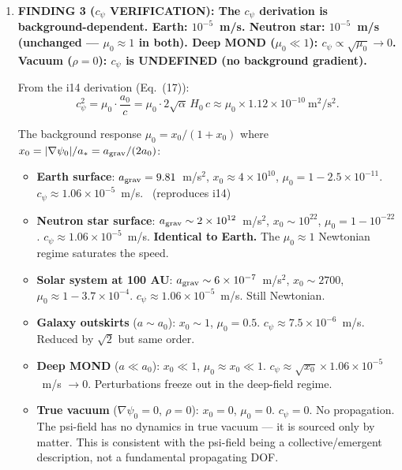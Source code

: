 \documentclass[11pt]{article}
\newcommand{\ee}[1]{\times 10^{#1}}
\begin{document}
\begin{tcolorbox}[colback=blue!5!white, colframe=blue!60!black,
  title=\textbf{W4i15 TOP 5 FINDINGS --- Ranked by Programme Impact}]
\begin{enumerate}
  \textbf{Impact}: P12 falls back to single-cavity performance:
  $C_1 = 0.47$, $\eta = 4 \times 0.47/(1.47)^2 = 87\%$. This is
  still excellent for single-cavity conversion but removes the
  multi-cavity path to $C > 1$. P12 status: remains THEORETICAL,
  with the multi-cavity superradiance claim now requiring an
  EM-mediated inter-cavity coupling mechanism (not psi-mode).

\item \textbf{FINDING 3 ($c_\psi$ VERIFICATION): The $c_\psi$ derivation
  is background-dependent. Earth: $10^{-5}$~m/s. Neutron star:
  $10^{-5}$~m/s (unchanged --- $\mu_0 \approx 1$ in both).
  Deep MOND ($\mu_0 \ll 1$): $c_\psi \propto \sqrt{\mu_0} \to 0$.
  Vacuum ($\rho = 0$): $c_\psi$ is UNDEFINED (no background gradient).}

  From the i14 derivation (Eq.~(17)):
  \begin{equation}
  c_\psi^2 = \mu_0 \cdot \frac{a_0}{c} = \mu_0 \cdot 2\sqrt{\alpha}\,H_0\,c
  \approx \mu_0 \times 1.12\ee{-10}~\text{m}^2/\text{s}^2.
  \end{equation}

  The background response $\mu_0 = x_0/(1+x_0)$ where
  $x_0 = |\nabla\psi_0|/a_* = a_{\rm grav}/(2a_0)$:

  \begin{itemize}[nosep]
  \item \textbf{Earth surface}: $a_{\rm grav} = 9.81$~m/s$^2$,
    $x_0 \approx 4\ee{10}$, $\mu_0 = 1 - 2.5\ee{-11}$.
    $c_\psi \approx 1.06\ee{-5}$~m/s. \checkmark\ (reproduces i14)
  \item \textbf{Neutron star surface}: $a_{\rm grav} \sim 2\ee{12}$~m/s$^2$,
    $x_0 \sim 10^{22}$, $\mu_0 = 1 - 10^{-22}$.
    $c_\psi \approx 1.06\ee{-5}$~m/s. \textbf{Identical to Earth.}
    The $\mu_0 \approx 1$ Newtonian regime saturates the speed.
  \item \textbf{Solar system at 100 AU}: $a_{\rm grav} \sim 6\ee{-7}$~m/s$^2$,
    $x_0 \sim 2700$, $\mu_0 \approx 1 - 3.7\ee{-4}$.
    $c_\psi \approx 1.06\ee{-5}$~m/s. Still Newtonian.
  \item \textbf{Galaxy outskirts} ($a \sim a_0$): $x_0 \sim 1$,
    $\mu_0 = 0.5$. $c_\psi \approx 7.5\ee{-6}$~m/s. Reduced by
    $\sqrt{2}$ but same order.
  \item \textbf{Deep MOND} ($a \ll a_0$): $x_0 \ll 1$,
    $\mu_0 \approx x_0 \ll 1$.
    $c_\psi \approx \sqrt{x_0} \times 1.06\ee{-5}$~m/s $\to 0$.
    Perturbations freeze out in the deep-field regime.
  \item \textbf{True vacuum} ($\nabla\psi_0 = 0$, $\rho = 0$):
    $x_0 = 0$, $\mu_0 = 0$. $c_\psi = 0$. No propagation.
    The psi-field has no dynamics in true vacuum --- it is sourced
    only by matter. This is consistent with the psi-field being a
    collective/emergent description, not a fundamental propagating DOF.
  \end{itemize}


\end{enumerate}
\end{tcolorbox}
\end{document}
